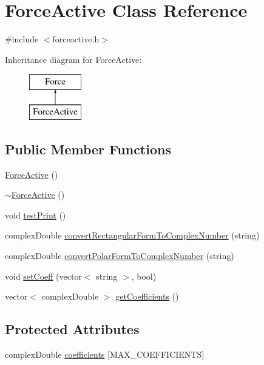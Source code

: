 \hypertarget{class_force_active}{\section{Force\-Active Class Reference}
\label{class_force_active}
}


{\ttfamily \#include $<$forceactive.\-h$>$}

Inheritance diagram for Force\-Active\-:\begin{figure}[H]
\begin{center}
\leavevmode
\includegraphics[height=2.000000cm]{class_force_active}
\end{center}
\end{figure}
\subsection*{Public Member Functions}
\begin{DoxyCompactItemize}
\item 
\hyperlink{class_force_active_ae006e3394f8c925c6a3218686c5cc8ae}{Force\-Active} ()
\item 
\hyperlink{class_force_active_aa2db4bc1fb74ecb6e0ee46c59a40dd2a}{$\sim$\-Force\-Active} ()
\item 
void \hyperlink{class_force_active_a8f209e7485e2086c4b7013511a96961e}{test\-Print} ()
\item 
complex\-Double \hyperlink{class_force_active_aebc48c0ba0f2d7a2a18059ad7ff1c3e8}{convert\-Rectangular\-Form\-To\-Complex\-Number} (string)
\item 
complex\-Double \hyperlink{class_force_active_a3e8d5604c7e0ecf12fbe1d1acf1a2e89}{convert\-Polar\-Form\-To\-Complex\-Number} (string)
\item 
void \hyperlink{class_force_active_a54690a658cdb9d7684f3063420ec6e1c}{set\-Coeff} (vector$<$ string $>$, bool)
\item 
vector$<$ complex\-Double $>$ \hyperlink{class_force_active_a9a4b712b31f3c40327a6bb68ff1aa565}{get\-Coefficients} ()
\end{DoxyCompactItemize}
\subsection*{Protected Attributes}
\begin{DoxyCompactItemize}
\item 
complex\-Double \hyperlink{class_force_active_ab83eebfa9ec47878caa32da3f8885022}{coefficients} \mbox{[}M\-A\-X\-\_\-\-C\-O\-E\-F\-F\-I\-C\-I\-E\-N\-T\-S\mbox{]}
\end{DoxyCompactItemize}


